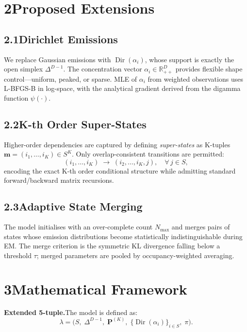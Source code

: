 \documentclass[10pt,a4paper,twocolumn]{article}
\DeclareMathOperator{\Dir}{Dir}
\begin{document}
\section*{2\enspace Proposed Extensions}

\subsection*{2.1\enspace Dirichlet Emissions}
We replace Gaussian emissions with $\Dir(\alpha_i)$, whose support is exactly the open simplex $\Delta^{D-1}$.
The concentration vector $\alpha_i\in\mathbb{R}^D_{++}$ provides flexible shape control---uniform, peaked, or sparse.
MLE of $\alpha_i$ from weighted observations uses L-BFGS-B in log-space, with the analytical gradient derived from the digamma function $\psi(\cdot)$.

\subsection*{2.2\enspace K-th Order Super-States}
Higher-order dependencies are captured by defining \emph{super-states} as K-tuples $\mathbf{m}=(i_1,\ldots,i_K)\in S^K$.
Only overlap-consistent transitions are permitted:
\[
  (i_1,\ldots,i_K)\;\longrightarrow\;(i_2,\ldots,i_K,j),\quad\forall\,j\in S,
\]
encoding the exact K-th order conditional structure while admitting standard forward/backward matrix recursions.

\subsection*{2.3\enspace Adaptive State Merging}
The model initialises with an over-complete count $N_{\max}$ and merges pairs of states whose emission distributions become statistically indistinguishable during EM.
The merge criterion is the symmetric KL divergence falling below a threshold $\tau$; merged parameters are pooled by occupancy-weighted averaging.

\section*{3\enspace Mathematical Framework}

\textbf{Extended 5-tuple.}\enspace The model is defined as:
\[
  \lambda = \bigl(S,\;\Delta^{D-1},\;\mathbf{P}^{(K)},\;\{\Dir(\alpha_i)\}_{i\in S},\;\pi\bigr).
\]
\end{document}
